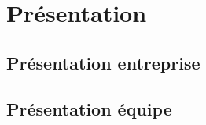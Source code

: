 \chapter{Présentation}
    \lipsum[1]
    
\section{Présentation entreprise}
    \lipsum[1-2]

\section{Présentation équipe}
    \lipsum[1-2]